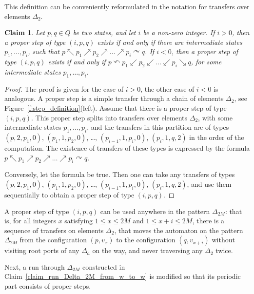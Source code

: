 \documentclass[12pt,a4paper]{article}
\newtheorem{claim}{Claim}
\theoremstyle{definition}
\begin{document}
This definition can be conveniently reformulated
in the notation for transfers over elements $\Delta_2$.

\begin{claim}\label{claim_sequence_for_step_partition}
Let $p,q \in Q$ be two states, and let $i$ be a non-zero integer.
If $i > 0$, then a proper step of type $(i,p,q)$
exists if and only if
there are intermediate states $p_1,\ldots,p_i$,
such that $p \nwarrow p_1 \nearrow p_2 \nearrow \ldots \nearrow p_i \curvearrowright q$.
If $i < 0$, then a proper step of type $(i,p,q)$
exists if and only if
$p \curvearrowleft p_1 \swarrow p_2 \swarrow \ldots \swarrow p_i \searrow q$,
for some intermediate states $p_1,\ldots,p_i$.
\end{claim}
\begin{proof}
The proof is given for the case of $i>0$,
the other case of $i<0$ is analogous.
A proper step is a simple transfer through a chain of elements $\Delta_2$,
see Figure~\ref{f:step_definition}(left).
Assume that there is a proper step of type $(i,p,q)$.
This proper step splits into transfers over elements $\Delta_2$,
with some intermediate states $p_1, \ldots, p_i$,
and the transfers in this partition
are of types
$(p,2,p_1,0)$, $(p_1,1,p_2,0)$, \ldots, $(p_{i-1},1,p_i,0)$, $(p_i,1,q,2)$
in the order of the computation.
The existence of transfers of these types
is expressed by the formula
$p \nwarrow p_1 \nearrow p_2 \nearrow \ldots \nearrow p_i \curvearrowright q$.

Conversely, let the formula be true.
Then one can take any transfers
of types $(p,2,p_1,0)$, $(p_1,1,p_2,0)$, \ldots, $(p_{i-1},1,p_i,0)$, $(p_i,1,q,2)$,
and use them sequentially to obtain a proper step of type $(i,p,q)$.
\end{proof}

A proper step of type $(i,p,q)$ can be used anywhere in the pattern $\Delta_{2M}$:
that is, for all integers $x$ satisfying $1 \leqslant x \leqslant 2M$
and $1 \leqslant x+i \leqslant 2M$,
there is a sequence of transfers
on elements $\Delta_2$, that moves the automaton on the pattern $\Delta_{2M}$
from the configuration $(p, v_x)$ 
to the configuration $(q,v_{x+i})$
without visiting root ports of any $\Delta_a$ on the way,
and never traversing any $\Delta_2$ twice.

Next, a run through $\Delta_{2M}$ constructed in Claim~\ref{claim_run_Delta_2M_from_w_to_w}
is modified so that its periodic part consists of proper steps.
\end{document}
